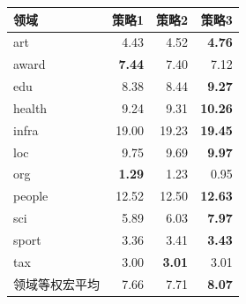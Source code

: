 \begin{tabular}{lrrr}
\toprule
领域 & 策略1 & 策略2 & 策略3 \\
\midrule
art & 4.43 & 4.52 & \textbf{4.76} \\
award & \textbf{7.44} & 7.40 & 7.12 \\
edu & 8.38 & 8.44 & \textbf{9.27} \\
health & 9.24 & 9.31 & \textbf{10.26} \\
infra & 19.00 & 19.23 & \textbf{19.45} \\
loc & 9.75 & 9.69 & \textbf{9.97} \\
org & \textbf{1.29} & 1.23 & 0.95 \\
people & 12.52 & 12.50 & \textbf{12.63} \\
sci & 5.89 & 6.03 & \textbf{7.97} \\
sport & 3.36 & 3.41 & \textbf{3.43} \\
tax & 3.00 & \textbf{3.01} & 3.01 \\
\midrule
领域等权宏平均 & 7.66 & 7.71 & \textbf{8.07} \\
\bottomrule
\end{tabular}

